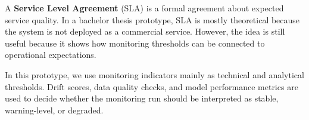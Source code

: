 A \textbf{Service Level Agreement} (SLA) is a formal agreement about expected service quality. In a bachelor thesis prototype, SLA is mostly theoretical because the system is not deployed as a commercial service. However, the idea is still useful because it shows how monitoring thresholds can be connected to operational expectations.\cite{AutonomousObservabilitySLOSLA}

In this prototype, we use monitoring indicators mainly as technical and analytical thresholds. Drift scores, data quality checks, and model performance metrics are used to decide whether the monitoring run should be interpreted as stable, warning-level, or degraded.
